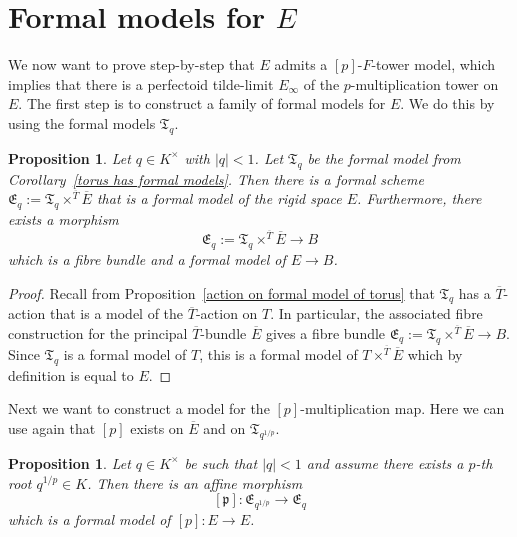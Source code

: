 \documentclass[11pt,oneside]{amsart}
\newtheorem{proposition}[theorem]{Proposition}
\theoremstyle{definition}
\theoremstyle{remark}
\begin{document}
	\section{Formal models for $E$}
	We now want to prove step-by-step that $E$ admits a $[p]$-$F$-tower model, which implies that there is a perfectoid tilde-limit $E_\infty$ of the $p$-multiplication tower on $E$.
	The first step is to construct a family of formal models for $E$. We do this by using the formal models $\mathfrak T_q$.
	\begin{proposition}
	Let $q\in K^\times$ with $|q|<1$. Let $\mathfrak T_q$ be the formal model from Corollary~\ref{torus has formal models}. Then there is a formal scheme $\mathfrak E_q :=\mathfrak T_q \times^{\overline{T}}\overline{E}$ that is a formal model of the rigid space $E$. Furthermore, there exists a morphism
	\[\mathfrak E_q :=\mathfrak T_q \times^{\overline{T}} \overline{E} \rightarrow B \]
	which is a fibre bundle and a formal model of $E\rightarrow B$.
	\end{proposition}
	\begin{proof}
		Recall from Proposition~\ref{action on formal model of torus} that $\mathfrak T_q$ has a $\overline{T}$-action that is a model of the $\overline{T}$-action on $T$. In particular, the associated fibre construction for the principal $\overline{T}$-bundle $\overline{E}$ gives a fibre bundle $\mathfrak E_q :=\mathfrak T_q \times^{\overline{T}} \overline{E} \rightarrow B$. Since $\mathfrak T_q$ is a formal model of $T$, this is a formal model of $T\times^{\overline{T}}\overline{E}$ which by definition is equal to $E$.
	\end{proof}
	Next we want to construct a model for the $[p]$-multiplication map. Here we can use again that $[p]$ exists on $\overline{E}$ and on $\mathfrak T_{q^{1/p}}$.
	\begin{proposition}\label{formal model of p-multiplication on E}
		Let $q\in K^\times$ be such that $|q|<1$ and assume there exists a $p$-th root $q^{1/p}\in K$. Then there is an affine morphism
		\[[\mathfrak p]:\mathfrak E_{q^{1/p}} \rightarrow  \mathfrak E_{q}\]
		which is a formal model of $[p]:E\rightarrow E$.
	\end{proposition}
\end{document}
